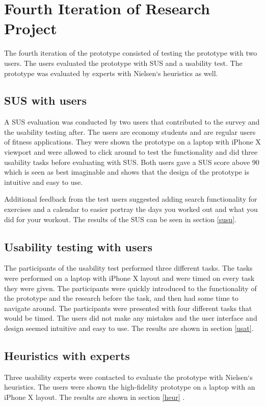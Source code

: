 \section{Fourth Iteration of Research Project}
The fourth iteration of the prototype consisted of testing the prototype with two users. The users evaluated the prototype with SUS and a usability test. The prototype was evaluated by experts with Nielsen`s heuristics as well.

\subsection{SUS with users}
A SUS evaluation was conducted by two users that contributed to the survey and the usability testing after. The users are economy students and are regular users of fitness applications.
They were shown the prototype on a laptop with iPhone X viewport and were allowed to click around to test the functionality and did three usability tasks before evaluating with SUS. Both users gave a SUS score above 90 which is seen as best imaginable and shows that the design of the prototype is intuitive and easy to use.

Additional feedback from the test users suggested adding search functionality for exercises and a calendar to easier portray the days you worked out and what you did for your workout. The results of the SUS can be seen in section \ref{susu}.

\subsection{Usability testing with users}
The participants of the usability test performed three different tasks. The tasks were performed on a laptop with iPhone X layout and were timed on every task they were given. The participants were quickly introduced to the functionality of the prototype and the research before the task, and then had some time to navigate around. The participants were presented with four different tasks that would be timed.
The users did not make any mistakes and the user interface and design seemed intuitive and easy to use. The results are shown in section \ref{usat}.

\subsection{Heuristics with experts}
Three usability experts were contacted to evaluate the prototype with Nielsen`s heuristics. The users were shown the high-fidelity prototype on a laptop with an iPhone X layout. The results are shown in section \ref{heur} .


